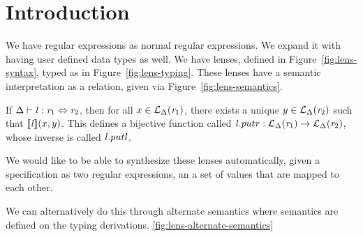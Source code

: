 
\section{Introduction}





We have regular expressions as normal regular expressions.
We expand it with having user defined data types as well.
We have lenses, defined in Figure~\ref{fig:lens-syntax}, typed as in Figure~\ref{fig:lens-typing}.
These lenses have a semantic interpretation as a relation, given via Figure~\ref{fig:lens-semantics}.
\begin{theorem}
\label{thm:lens-bij-fcn}
If $\Delta \vdash \mathit{l} : \mathit{r}_1 \Leftrightarrow \mathit{r}_2$,
then for all $x \in \mathcal{L}_{\Delta}(\mathit{r}_1)$, there exists a unique $y \in \mathcal{L}_{\Delta}(\mathit{r}_2)$ such that $[ \! [\mathit{l}] \! ](x,y)$.
This defines a bijective function called $\mathit{l}.putr : \mathcal{L}_{\Delta}(\mathit{r}_1) \rightarrow \mathcal{L}_{\Delta}(\mathit{r}_2)$,
whose inverse is called $\mathit{l}.putl$.
\end{theorem}
We would like to be able to synthesize these lenses automatically, given a
specification as two regular expressions, an a set of values that are
mapped to each other.



We can alternatively do this through alternate semantics where semantics are defined on the typing derivations. \ref{fig:lens-alternate-semantics}

